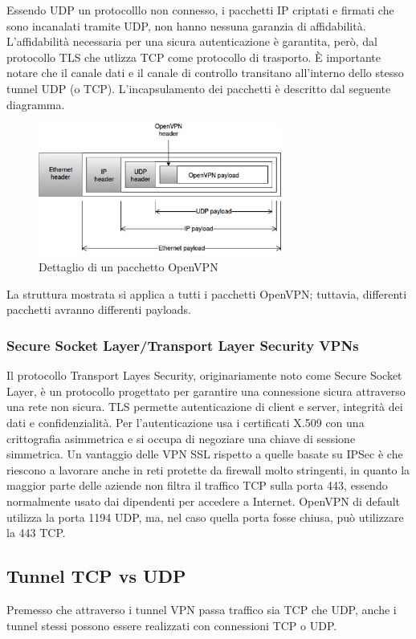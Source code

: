 Essendo UDP un protocolllo non connesso, i pacchetti IP criptati e firmati che sono incanalati tramite UDP, non hanno nessuna garanzia di affidabilità. L'affidabilità necessaria per una sicura autenticazione è garantita, però, dal protocollo TLS che utlizza TCP come protocollo di trasporto.
È importante notare che il canale dati e il canale di controllo transitano all'interno dello stesso tunnel UDP (o TCP). L'incapsulamento dei pacchetti è descritto dal seguente diagramma.

\begin{figure}
    \centering
    \includegraphics[width=8cm]{figure/OVPN_packet.png}
    \caption{Dettaglio di un pacchetto OpenVPN}
\end{figure}

La struttura mostrata si applica a tutti i pacchetti OpenVPN; tuttavia, differenti pacchetti avranno differenti payloads.


\subsubsection{Secure Socket Layer/Transport Layer Security VPNs}
Il protocollo Transport Layes Security, originariamente noto come Secure Socket Layer, è un protocollo progettato per garantire una connessione sicura attraverso una rete non sicura. TLS permette autenticazione di client e server, integrità dei dati e confidenzialità. Per l'autenticazione usa i certificati X.509 \cite[RFC5280]{RFC5280} con una crittografia asimmetrica e si occupa di negoziare una chiave di sessione simmetrica.
Un vantaggio delle VPN SSL rispetto a quelle basate su IPSec è che riescono a lavorare anche in reti protette da firewall molto stringenti, in quanto la maggior parte delle aziende non filtra il traffico TCP sulla porta 443, essendo normalmente usato dai dipendenti per accedere a Internet. OpenVPN di default utilizza la porta 1194 UDP, ma, nel caso quella porta fosse chiusa, può utilizzare la 443 TCP.


\subsection{Tunnel TCP vs UDP}
Premesso che attraverso i tunnel VPN passa traffico sia TCP che UDP, anche i tunnel stessi possono essere realizzati con connessioni TCP o UDP.

